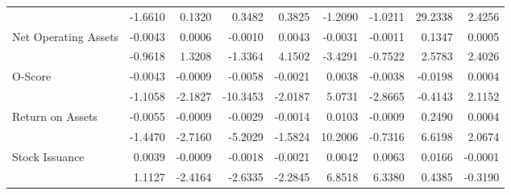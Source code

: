 \begin{table}[h]
{\begin{tabular}{@{}lrrrrrrrr@{}}
     & -1.6610 & 0.1320 & 0.3482 & 0.3825 & -1.2090 & -1.0211 & 29.2338 & 2.4256 \\
    \multirow{2}{*}{Net Operating Assets} & -0.0043 & 0.0006 & -0.0010 & 0.0043 & -0.0031 & -0.0011 & 0.1347 & 0.0005 \\
     & -0.9618 & 1.3208 & -1.3364 & 4.1502 & -3.4291 & -0.7522 & 2.5783 & 2.4026 \\
    \multirow{2}{*}{O-Score} & -0.0043 & -0.0009 & -0.0058 & -0.0021 & 0.0038 & -0.0038 & -0.0198 & 0.0004 \\
     & -1.1058 & -2.1827 & -10.3453 & -2.0187 & 5.0731 & -2.8665 & -0.4143 & 2.1152 \\
    \multirow{2}{*}{Return on Assets} & -0.0055 & -0.0009 & -0.0029 & -0.0014 & 0.0103 & -0.0009 & 0.2490 & 0.0004 \\
     & -1.4470 & -2.7160 & -5.2029 & -1.5824 & 10.2006 & -0.7316 & 6.6198 & 2.0674 \\
    \multirow{2}{*}{Stock Issuance} & 0.0039 & -0.0009 & -0.0018 & -0.0021 & 0.0042 & 0.0063 & 0.0166 & -0.0001 \\
     & 1.1127 & -2.4164 & -2.6335 & -2.2845 & 6.8518 & 6.3380 & 0.4385 & -0.3190 \\ \bottomrule
    \end{tabular}%
    }
    \end{table}
